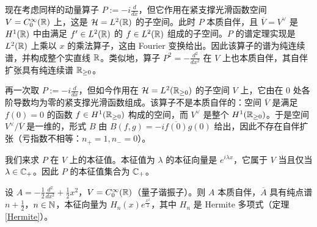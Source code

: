 \begin{example} 现在考虑同样的动量算子 $P:=-i\frac{d}{dx}$，但它作用在紧支撑光滑函数空间 $V=C_0^\infty(\Bbb R)$ 上，这是 $\mathcal H=L^2(\Bbb R)$ 的子空间。此时 $P$ 本质自伴，且 $\overline V=V^\vee$ 是 $H^1(\Bbb R)$ 中由满足 $f'\in L^2(\Bbb R)$ 的 $f\in L^2(\Bbb R)$ 组成的子空间。$P$ 的谱定理实现是 $L^2(\Bbb R)$ 上乘以 $x$ 的乘法算子，这由 Fourier 变换给出。因此该算子的谱为纯连续谱，并构成整个实直线 $\Bbb R$。类似地，算子 $P^2=-\frac{d^2}{dx^2}$ 在 $V$ 上也本质自伴，其自伴扩张具有纯连续谱 $\Bbb R_{\ge 0}$。
\end{example}

\begin{example} 再一次取 $P:=-i\frac{d}{dx}$，但如今作用在 $\mathcal H=L^2(\Bbb R_{\ge 0})$ 的子空间 $V$ 上，它由在 $0$ 处各阶导数均为零的紧支撑光滑函数组成。该算子不是本质自伴的：空间 $\overline V$ 是满足 $f(0)=0$ 的函数 $f\in H^1(\Bbb R_{\ge 0})$ 构成的空间，而 $V^\vee$ 是整个 $H^1(\Bbb R_{\ge 0})$。于是空间 $V^\vee/\overline V$ 是一维的，形式 $B$ 由 $B(f,g)=-i\overline{f(0)}g(0)$ 给出，因此不存在自伴扩张（亏指数不相等：$n_+=1,n_-=0$）。

我们来求 $P$ 在 $V$ 上的本征值。本征值为 $\lambda$ 的本征向量是 $e^{i\lambda x}$，它属于 $V$ 当且仅当 $\lambda\in \Bbb C_+$。因此 $P$ 的本征值集合为 $\Bbb C_+$。
\end{example}


\begin{example}\label{harosc1} 设 $A=-\frac{1}{2}\frac{d^2}{dx^2}+\frac{1}{2}x^2$，$V=C^\infty_0(\Bbb R)$（量子谐振子）。则 $A$ 本质自伴，$\overline A$ 具有纯点谱 $n+\frac{1}{2}$，$n\in \Bbb N$，本征向量为 $H_n(x)e^{\frac{x^2}{2}}$，其中 $H_n$ 是 Hermite 多项式（定理 \ref{Hermite}）。
\end{example}


